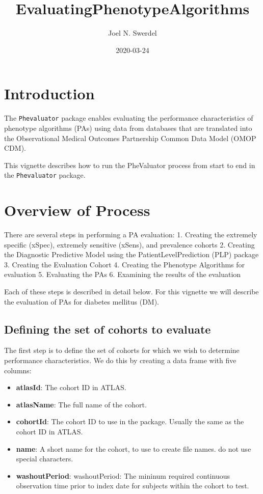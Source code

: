\documentclass[
]{article}
\title{EvaluatingPhenotypeAlgorithms}
\author{Joel N. Swerdel}
\date{2020-03-24}
\providecommand{\tightlist}{%
  \setlength{\itemsep}{0pt}\setlength{\parskip}{0pt}}
\begin{document}
\maketitle

{
\setcounter{tocdepth}{3}
\tableofcontents
}
\newpage

\hypertarget{introduction}{%
\section{Introduction}\label{introduction}}

The \texttt{Phevaluator} package enables evaluating the performance
characteristics of phenotype algorithms (PAs) using data from databases
that are translated into the Observational Medical Outcomes Partnership
Common Data Model (OMOP CDM).

This vignette describes how to run the PheValuator process from start to
end in the \texttt{Phevaluator} package.

\hypertarget{overview-of-process}{%
\section{Overview of Process}\label{overview-of-process}}

There are several steps in performing a PA evaluation: 1. Creating the
extremely specific (xSpec), extremely sensitive (xSens), and prevalence
cohorts 2. Creating the Diagnostic Predictive Model using the
PatientLevelPrediction (PLP) package 3. Creating the Evaluation Cohort
4. Creating the Phenotype Algorithms for evaluation 5. Evaluating the
PAs 6. Examining the results of the evaluation

Each of these steps is described in detail below. For this vignette we
will describe the evaluation of PAs for diabetes mellitus (DM).

\hypertarget{defining-the-set-of-cohorts-to-evaluate}{%
\subsection{Defining the set of cohorts to
evaluate}\label{defining-the-set-of-cohorts-to-evaluate}}

The first step is to define the set of cohorts for which we wish to
determine performance characteristics. We do this by creating a data
frame with five columns:

\begin{itemize}
\tightlist
\item
  \textbf{atlasId}: The cohort ID in ATLAS.
\item
  \textbf{atlasName}: The full name of the cohort.
\item
  \textbf{cohortId}: The cohort ID to use in the package. Usually the
  same as the cohort ID in ATLAS.
\item
  \textbf{name}: A short name for the cohort, to use to create file
  names. do not use special characters.
\item
  \textbf{washoutPeriod}: washoutPeriod: The mininum required continuous
  observation time prior to index date for subjects within the cohort to
  test.
\end{itemize}
\end{document}
